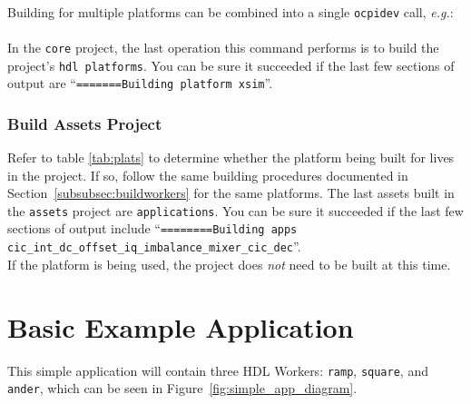  \\

Building for multiple platforms can be combined into a single \texttt{ocpidev} call, \textit{e.g.}:\\

 \\

In the \texttt{core} project, the last operation this command performs is to build the project's \texttt{hdl platforms}. You can be sure it succeeded if the last few sections of output are ``\texttt{=======Building platform xsim}''.\\
\begin{center}
\end{center}


\subsubsection{Build Assets Project}
Refer to table \ref{tab:plats} to determine whether the platform being built for lives in the  project. If so, follow the same building procedures documented in Section~\ref{subsubsec:buildworkers} for the same platforms. The last assets built in the \texttt{assets} project are \texttt{applications}. You can be sure it succeeded if the last few sections of output include ``\texttt{========Building apps cic\_int\_dc\_offset\_iq\_imbalance\_mixer\_cic\_dec}''.\\

If the  platform is being used, the  project does \textit{not} need to be built at this time.\\

\newpage
\section{Basic Example Application}
\label{sec:basic_example}
This simple application will contain three HDL Workers: \verb+ramp+, \verb+square+, and \verb+ander+, which can be seen in Figure~\ref{fig:simple_app_diagram}. \newline

